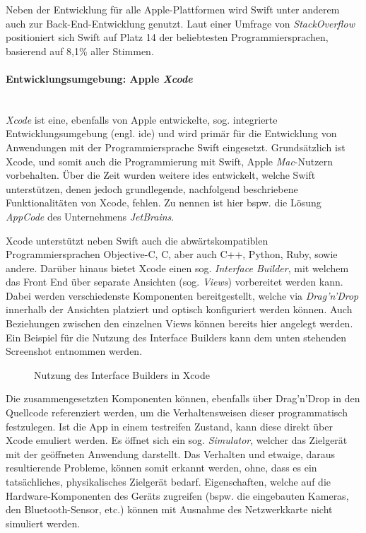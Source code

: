 Neben der Entwicklung für alle Apple-Plattformen wird Swift unter anderem auch zur Back-End-Entwicklung genutzt. Laut einer Umfrage von \textit{StackOverflow} positioniert sich Swift auf Platz 14 der beliebtesten Programmiersprachen, basierend auf 8,1\% aller Stimmen.

\paragraph{Entwicklungsumgebung: Apple \textit{Xcode}}\mbox{}\\
\textit{Xcode} ist eine, ebenfalls von Apple entwickelte, sog. integrierte Entwicklungsumgebung (engl. \ac{ide}) und wird primär für die Entwicklung von Anwendungen mit der Programmiersprache Swift eingesetzt. Grundsätzlich ist Xcode, und somit auch die Programmierung mit Swift, Apple \textit{Mac}-Nutzern vorbehalten. Über die Zeit wurden weitere \acp{ide} entwickelt, welche Swift unterstützen, denen jedoch grundlegende, nachfolgend beschriebene Funktionalitäten von Xcode, fehlen. Zu nennen ist hier bspw. die Lösung \textit{AppCode} des Unternehmens \textit{JetBrains}.

Xcode unterstützt neben Swift auch die abwärtskompatiblen Programmiersprachen Objective-C, C, aber auch C++, Python, Ruby, sowie andere. Darüber hinaus bietet Xcode einen sog. \textit{Interface Builder}, mit welchem das Front End über separate Ansichten (sog. \textit{Views}) vorbereitet werden kann. Dabei werden verschiedenste Komponenten bereitgestellt, welche via \textit{Drag'n'Drop} innerhalb der Ansichten platziert und optisch konfiguriert werden können. Auch Beziehungen zwischen den einzelnen Views können bereits hier angelegt werden. Ein Beispiel für die Nutzung des Interface Builders kann dem unten stehenden Screenshot entnommen werden.

\begin{figure}[h!]
	\centering
	\caption{Nutzung des Interface Builders in Xcode}
\end{figure}

Die zusammengesetzten Komponenten können, ebenfalls über Drag'n'Drop in den Quellcode referenziert werden, um die Verhaltensweisen dieser programmatisch festzulegen. Ist die App in einem testreifen Zustand, kann diese direkt über Xcode emuliert werden. Es öffnet sich ein sog. \textit{Simulator}, welcher das Zielgerät mit der geöffneten Anwendung darstellt. Das Verhalten und etwaige, daraus resultierende Probleme, können somit erkannt werden, ohne, dass es ein tatsächliches, physikalisches Zielgerät bedarf. Eigenschaften, welche auf die Hardware-Komponenten des Geräts zugreifen (bspw. die eingebauten Kameras, den Bluetooth-Sensor, etc.) können mit Ausnahme des Netzwerkkarte nicht simuliert werden.

